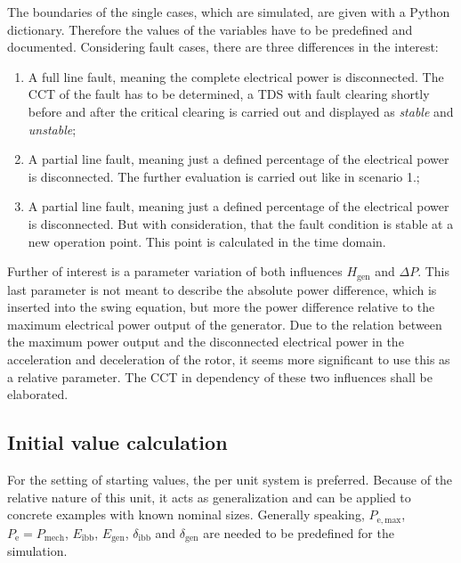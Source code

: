 The boundaries of the single cases, which are simulated, are given with a Python dictionary. Therefore the values of the variables have to be predefined and documented. Considering fault cases, there are three differences in the interest:
\begin{enumerate}
        \item A full line fault, meaning the complete electrical power is disconnected. The \acs{CCT} of the fault has to be determined, a \acs{TDS} with fault clearing shortly before and after the critical clearing is carried out and displayed as {\itshape stable} and {\itshape unstable};
        \item A partial line fault, meaning just a defined percentage of the electrical power is disconnected. The further evaluation is carried out like in scenario 1.;
        \item A partial line fault, meaning just a defined percentage of the electrical power is disconnected. But with consideration, that the fault condition is stable at a new operation point. This point is calculated in the time domain.
\end{enumerate}
Further of interest is a parameter variation of both influences $H_\mathrm{gen}$ and $\Delta P$. This last parameter is not meant to describe the absolute power difference, which is inserted into the swing equation, but more the power difference relative to the maximum electrical power output of the generator. Due to the relation between the maximum power output and the disconnected electrical power in the acceleration and deceleration of the rotor, it seems more significant to use this as a relative parameter. The \acs{CCT} in dependency of these two influences shall be elaborated.

\subsection{Initial value calculation}
\label{sec:initials}

For the setting of starting values, the per unit system is preferred. Because of the relative nature of this unit, it acts as generalization and can be applied to concrete examples with known nominal sizes. Generally speaking, $P_\mathrm{e,max}$, $P_\mathrm{e}=P_\mathrm{mech}$, $E_\mathrm{ibb}$, $E_\mathrm{gen}$, $\delta_\mathrm{ibb}$ and $\delta_\mathrm{gen}$ are needed to be predefined for the simulation. 

